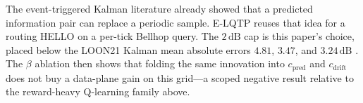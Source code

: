 The event-triggered Kalman literature
\cite{li2026dse,priel2023consensus,sebastian2024eco,deng2023auto,zhong2024tsp,deng2024lcsys}
already showed that a predicted information pair can replace a
periodic sample.
E-LQTP reuses that idea for a routing HELLO on a per-tick Bellhop
query.
The $2\,\mathrm{dB}$ cap is this paper's choice, placed below the
LOON21 Kalman mean absolute errors $4.81$, $3.47$, and
$3.24\,\mathrm{dB}$ \cite{busacca2024snr}.
The $\beta$ ablation then shows that folding the same innovation
into $c_{\mathrm{pred}}$ and $c_{\mathrm{drift}}$ does not buy a
data-plane gain on this grid---a scoped negative result relative
to the reward-heavy Q-learning family above.

